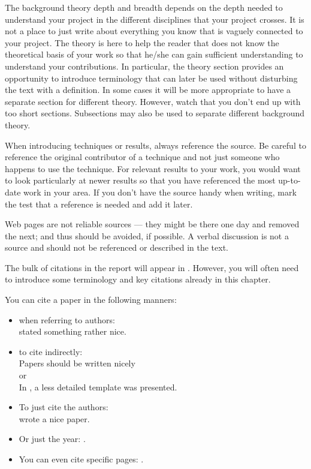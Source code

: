 
\begin{tcolorbox}[width=\linewidth, sharp corners=all, colback=white!96!black]

    The background theory depth and breadth depends on the depth needed to understand your project in the different disciplines that your project crosses.  It is not a place to just write about everything you know that is vaguely connected to your project. The theory is here to help the reader that does not know the theoretical basis of your work so that he/she can gain sufficient understanding to understand your contributions. In particular, the theory section provides an opportunity to introduce terminology that can later be used without disturbing the text with a definition.  In some cases it will be more appropriate to have a separate section for different theory. However, watch that you don't end up with too short sections. Subsections may also be used to separate different background theory.

    When introducing techniques or results, always reference the source. Be careful to reference the original contributor of a technique and not just someone who happens to use the technique. For relevant results to your work, you would want to look particularly at newer results so that you have referenced the most up-to-date work in your area. If you don't have the source handy when writing, mark the test that a reference is needed and add it later.

    Web pages are not reliable sources --- they might be there one day and removed the next; and thus should be avoided, if possible. A verbal discussion is not a source and should not be referenced or described in the text.

    The bulk of citations in the report will appear in . However, you will often need to introduce some terminology and key citations already in this chapter.

    You can cite a paper in the following manners:

    \begin{itemize}
        \item when referring to authors:\\
              \citet{Bandara2019} stated something rather nice.
        \item to cite indirectly: \\
              Papers should be written nicely \citep{Bandara2019}\\
              or\\
              In \cite{Bandara2019}, a less detailed template was presented.
        \item To just cite the authors: \\
              \citeauthor{Bandara2019} wrote a nice paper.
        \item Or just the year: \citeyear{Bandara2019}.
        \item You can even cite specific pages: \citet[p. 3]{Bandara2019}.
    \end{itemize}
\end{tcolorbox}

